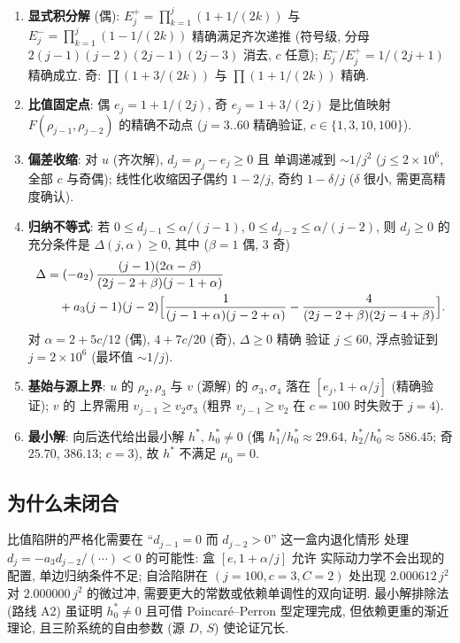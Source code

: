\documentclass[UTF8]{ctexart}
\begin{document}
\begin{enumerate}
	\item \textbf{显式积分解} (偶): $E^{+}_j = \prod_{k=1}^{j}(1 + 1/(2k))$ 与
		$E^{-}_j = \prod_{k=1}^{j}(1 - 1/(2k))$ 精确满足齐次递推
		(符号级, 分母 $2(j-1)(j-2)(2j-1)(2j-3)$ 消去, $c$ 任意);
		$E^{-}_j/E^{+}_j = 1/(2j+1)$ 精确成立. 奇: $\prod(1+3/(2k))$ 与
		$\prod(1+1/(2k))$ 精确.
	\item \textbf{比值固定点}: 偶 $e_j = 1 + 1/(2j)$, 奇 $e_j = 1 + 3/(2j)$
		是比值映射 $F(\rho_{j-1}, \rho_{j-2})$ 的精确不动点 ($j = 3..60$
		精确验证, $c \in \{1,3,10,100\}$).
	\item \textbf{偏差收缩}: 对 $u$ (齐次解), $d_j = \rho_j - e_j \geq 0$ 且
		单调递减到 $\sim 1/j^2$ ($j \leq 2\times10^6$, 全部 $c$ 与奇偶);
		线性化收缩因子偶约 $1 - 2/j$, 奇约 $1 - \delta/j$ ($\delta$ 很小,
		需更高精度确认).
	\item \textbf{归纳不等式}: 若 $0 \leq d_{j-1} \leq \alpha/(j-1)$,
		$0 \leq d_{j-2} \leq \alpha/(j-2)$, 则 $d_j \geq 0$ 的充分条件是
		$\Delta(j, \alpha) \geq 0$, 其中 ($\beta = 1$ 偶, $3$ 奇)
		\begin{equation}
			\begin{aligned}
				\Delta &= (-a_2)\,\frac{(j-1)(2\alpha - \beta)}
					{(2j-2+\beta)(j-1+\alpha)} \\
					&\quad + a_3 (j-1)(j-2)\Bigl[
						\frac{1}{(j-1+\alpha)(j-2+\alpha)}
						- \frac{4}{(2j-2+\beta)(2j-4+\beta)} \Bigr].
			\end{aligned}
		\end{equation}
		对 $\alpha = 2 + 5c/12$ (偶), $4 + 7c/20$ (奇), $\Delta \geq 0$ 精确
		验证 $j \leq 60$, 浮点验证到 $j = 2\times10^6$ (最坏值 $\sim 1/j$).
	\item \textbf{基始与源上界}: $u$ 的 $\rho_2, \rho_3$ 与 $v$ (源解) 的
		$\sigma_3, \sigma_4$ 落在 $[e_j, 1 + \alpha/j]$ (精确验证); $v$ 的
		上界需用 $v_{j-1} \geq v_2 \sigma_3$ (粗界 $v_{j-1} \geq v_2$ 在
		$c = 100$ 时失败于 $j = 4$).
	\item \textbf{最小解}: 向后迭代给出最小解 $h^*$, $h^*_0 \neq 0$ (偶
		$h^*_1/h^*_0 \approx 29.64$, $h^*_2/h^*_0 \approx 586.45$; 奇
		$25.70$, $386.13$; $c=3$), 故 $h^*$ 不满足 $\mu_0 = 0$.
\end{enumerate}

\subsection{为什么未闭合}

比值陷阱的严格化需要在 ``$d_{j-1} = 0$ 而 $d_{j-2} > 0$'' 这一盒内退化情形
处理 $d_j = -a_3 d_{j-2}/(\cdots) < 0$ 的可能性: 盒 $[e, 1+\alpha/j]$ 允许
实际动力学不会出现的配置, 单边归纳条件不足; 自洽陷阱在
$(j=100, c=3, C=2)$ 处出现 $2.000612\, j^2$ 对 $2.000000\, j^2$ 的微过冲,
需要更大的常数或依赖单调性的双向证明. 最小解排除法 (路线 A2) 虽证明
$h^*_0 \neq 0$ 且可借 Poincar\'e--Perron 型定理完成, 但依赖更重的渐近理论,
且三阶系统的自由参数 (源 $D$, $S$) 使论证冗长.
\end{document}
